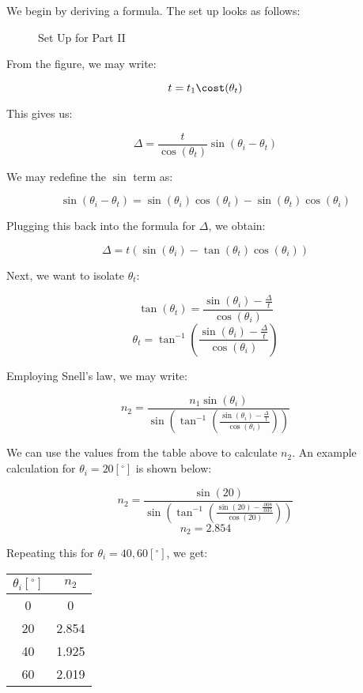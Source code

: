 \documentclass[
	letterpaper, %
	10pt, %
]{CSUniSchoolLabReport}
\begin{document}
We begin by deriving a formula. The set up looks as follows:

\begin{figure}[H]
  \centering
  
  \caption{Set Up for Part II}
  \label{fig:1}
\end{figure}

From the figure, we may write:

$$t=t_1\cost(\theta_t)$$

This gives us:

$$\Delta = \frac{t}{\cos(\theta_t)}\sin(\theta_i-\theta_t)$$

We may redefine the $\sin$ term as:

$$\sin(\theta_i-\theta_t)=\sin(\theta_i)\cos(\theta_t)-\sin(\theta_t)\cos(\theta_i)$$

Plugging this back into the formula for $\Delta$, we obtain:

$$\Delta=t(\sin(\theta_i)-\tan(\theta_t)\cos(\theta_i))$$

Next, we want to isolate $\theta_t$:

$$\tan(\theta_t)=\frac{\sin(\theta_i)-\frac{\Delta}{t}}{\cos(\theta_i)}$$
$$\theta_t=\tan^{-1}\left(\frac{\sin(\theta_i)-\frac{\Delta}{t}}{\cos(\theta_i)}\right)$$

Employing Snell's law, we may write:

$$n_2=\frac{n_1\sin(\theta_i)}{\sin\left( \tan^{-1} \left(\frac{\sin(\theta_i)-\frac{\Delta}{t}}{\cos(\theta_i)}\right)\right)}$$

We can use the values from the table above to calculate $n_2$. An example calculation for $\theta_i=20\left[ ^{\circ} \right]$ is shown below:

$$n_2=\frac{\sin(20)}{\sin\left(\tan^{-1}\left( \frac{\sin(20)-\frac{.008}{.035}}{\cos(20)} \right)\right)}$$
$$n_2=2.854$$

Repeating this for $\theta_i=40,60\left[ ^{\circ} \right]$, we get:

\begin{center}
  \begin{tabular}[H]{|c|c|}
    \hline
    $\theta_i\left[ ^{\circ} \right]$ & $n_2$\\
    \hline
    0 & 0\\
    \hline
    20 & 2.854\\
    \hline
    40 & 1.925\\
    \hline
    60 & 2.019\\
    \hline
  \end{tabular}
\end{center}
\end{document}
